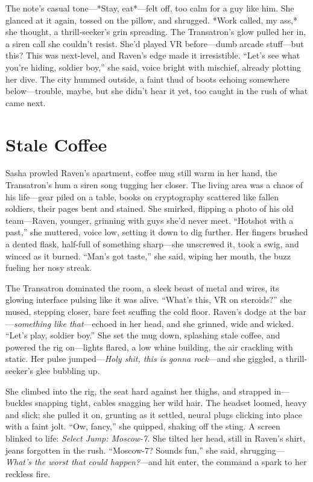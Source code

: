 \documentclass[12pt]{book}
\begin{document}
The note’s casual tone—*Stay, eat*—felt off, too calm for a guy like him. She glanced at it again, tossed on the pillow, and shrugged. *Work called, my ass,* she thought, a thrill-seeker’s grin spreading. The Transatron’s glow pulled her in, a siren call she couldn’t resist. She’d played VR before—dumb arcade stuff—but this? This was next-level, and Raven’s edge made it irresistible. “Let’s see what you’re hiding, soldier boy,” she said, voice bright with mischief, already plotting her dive. The city hummed outside, a faint thud of boots echoing somewhere below—trouble, maybe, but she didn’t hear it yet, too caught in the rush of what came next.

\section{Stale Coffee}

Sasha prowled Raven’s apartment, coffee mug still warm in her hand, the Transatron’s hum a siren song tugging her closer. The living area was a chaos of his life—gear piled on a table, books on cryptography scattered like fallen soldiers, their pages bent and stained. She smirked, flipping a photo of his old team—Raven, younger, grinning with guys she’d never meet. “Hotshot with a past,” she muttered, voice low, setting it down to dig further. Her fingers brushed a dented flask, half-full of something sharp—she unscrewed it, took a swig, and winced as it burned. “Man’s got taste,” she said, wiping her mouth, the buzz fueling her nosy streak.

The Transatron dominated the room, a sleek beast of metal and wires, its glowing interface pulsing like it was alive. “What’s this, VR on steroids?” she mused, stepping closer, bare feet scuffing the cold floor. Raven’s dodge at the bar—\textit{something like that}—echoed in her head, and she grinned, wide and wicked. “Let’s play, soldier boy.” She set the mug down, splashing stale coffee, and powered the rig on—lights flared, a low whine building, the air crackling with static. Her pulse jumped—\textit{Holy shit, this is gonna rock}—and she giggled, a thrill-seeker’s glee bubbling up.

She climbed into the rig, the seat hard against her thighs, and strapped in—buckles snapping tight, cables snagging her wild hair. The headset loomed, heavy and slick; she pulled it on, grunting as it settled, neural plugs clicking into place with a faint jolt. “Ow, fancy,” she quipped, shaking off the sting. A screen blinked to life: \textit{Select Jump: Moscow-7.} She tilted her head, still in Raven’s shirt, jeans forgotten in the rush. “Moscow-7? Sounds fun,” she said, shrugging—\textit{What’s the worst that could happen?}—and hit enter, the command a spark to her reckless fire.
\end{document}
